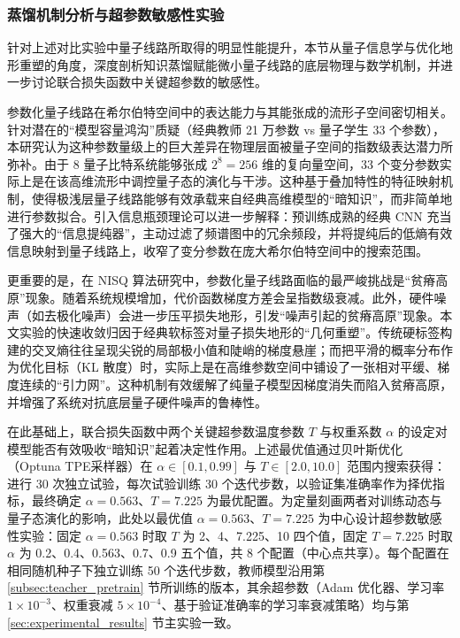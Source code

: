\subsubsection{蒸馏机制分析与超参数敏感性实验}
\label{subsec:theoretical_analysis}

针对上述对比实验中量子线路所取得的明显性能提升，本节从量子信息学与优化地形重塑的角度，深度剖析知识蒸馏赋能微小量子线路的底层物理与数学机制，并进一步讨论联合损失函数中关键超参数的敏感性。

参数化量子线路在希尔伯特空间中的表达能力与其能张成的流形子空间密切相关。针对潜在的“模型容量鸿沟”质疑（经典教师 21 万参数 vs 量子学生 33 个参数），本研究认为这种参数量级上的巨大差异在物理层面被量子空间的指数级表达潜力所弥补。由于 8 量子比特系统能够张成 $2^8 = 256$ 维的复向量空间，33 个变分参数实际上是在该高维流形中调控量子态的演化与干涉。这种基于叠加特性的特征映射机制，使得极浅层量子线路能够有效承载来自经典高维模型的“暗知识”，而非简单地进行参数拟合。引入信息瓶颈理论可以进一步解释：预训练成熟的经典 CNN 充当了强大的“信息提纯器”，主动过滤了频谱图中的冗余频段，并将提纯后的低熵有效信息映射到量子线路上，收窄了变分参数在庞大希尔伯特空间中的搜索范围。

更重要的是，在 NISQ 算法研究中，参数化量子线路面临的最严峻挑战是“贫瘠高原”现象。随着系统规模增加，代价函数梯度方差会呈指数级衰减。此外，硬件噪声（如去极化噪声）会进一步压平损失地形，引发“噪声引起的贫瘠高原”现象。本文实验的快速收敛归因于经典软标签对量子损失地形的“几何重塑”。传统硬标签构建的交叉熵往往呈现尖锐的局部极小值和陡峭的梯度悬崖；而把平滑的概率分布作为优化目标（KL 散度）时，实际上是在高维参数空间中铺设了一张相对平缓、梯度连续的“引力网”。这种机制有效缓解了纯量子模型因梯度消失而陷入贫瘠高原，并增强了系统对抗底层量子硬件噪声的鲁棒性。

在此基础上，联合损失函数中两个关键超参数温度参数 $T$ 与权重系数 $\alpha$ 的设定对模型能否有效吸收“暗知识”起着决定性作用。上述最优值通过贝叶斯优化（Optuna TPE采样器）在 $\alpha \in [0.1, 0.99]$ 与 $T \in [2.0, 10.0]$ 范围内搜索获得：进行 30 次独立试验，每次试验训练 30 个迭代步数，以验证集准确率作为择优指标，最终确定 $\alpha=0.563$、$T=7.225$ 为最优配置。为定量刻画两者对训练动态与量子态演化的影响，此处以最优值 $\alpha=0.563$、$T=7.225$ 为中心设计超参数敏感性实验：固定 $\alpha=0.563$ 时取 $T$ 为 2、4、7.225、10 四个值，固定 $T=7.225$ 时取 $\alpha$ 为 0.2、0.4、0.563、0.7、0.9 五个值，共 8 个配置（中心点共享）。每个配置在相同随机种子下独立训练 50 个迭代步数，教师模型沿用第 \ref{subsec:teacher_pretrain} 节所训练的版本，其余超参数（Adam 优化器、学习率 $1\times10^{-3}$、权重衰减 $5 \times 10^{-4}$、基于验证准确率的学习率衰减策略）均与第 \ref{sec:experimental_results} 节主实验一致。

